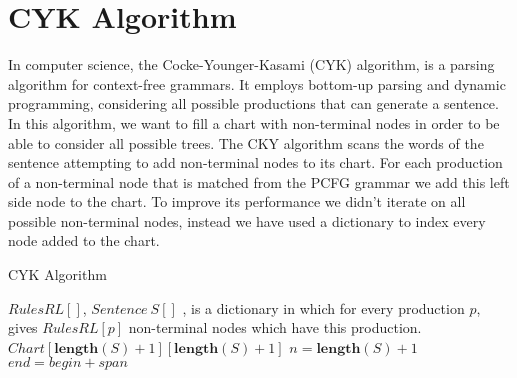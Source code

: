 \documentclass[a4paper,11pt]{article}
\begin{document}
\section{CYK Algorithm}
\label{cyk}
In computer science, the Cocke-Younger-Kasami (CYK) algorithm, is a parsing algorithm for context-free grammars. It employs bottom-up parsing and dynamic programming, considering all possible productions that can generate a sentence. In this algorithm, we want to fill a chart with non-terminal nodes in order to be able to consider all possible trees.
The CKY algorithm scans the words of the sentence attempting to add non-terminal nodes to its chart. For each production of a non-terminal node that is matched from the PCFG grammar we add this left side node to the chart. To improve its performance we didn't iterate on all possible non-terminal nodes, instead we have used a dictionary to index every node added to the chart.

\begin{algorithm}[t!]
\caption{CYK Algorithm}
\label{cky}
\begin{small}
\begin{algorithmic}[1]
$RulesRL[]$, $Sentence\ S[]$
, is a dictionary in which for every production $p$, gives $RulesRL[p]$ non-terminal nodes which have this production.
$Chart[\textbf{length}(S)+1][\textbf{length}(S)+1]$
\ELSE
{}
\ENDFOR
\ENDIF
{}
\ENDFOR
\STATE $n = \textbf{length}(S) + 1$
\STATE $end = begin + span$
\ENDFOR
\ENDFOR
\ENDFOR
\ENDFOR
{}
\ENDFOR
\ENDFOR
\end{algorithmic}
\end{small}
\end{algorithm}
\end{document}
